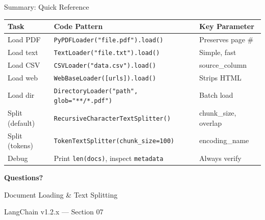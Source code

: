 \documentclass[aspectratio=169,11pt]{beamer}
\begin{document}
\begin{frame}{Summary: Quick Reference}
  \begin{center}
    \small
    \begin{tabular}{lll}
      \toprule
      \textbf{Task} & \textbf{Code Pattern} & \textbf{Key Parameter} \\
      \midrule
      Load PDF & \texttt{PyPDFLoader("file.pdf").load()} & Preserves page \# \\
      Load text & \texttt{TextLoader("file.txt").load()} & Simple, fast \\
      Load CSV & \texttt{CSVLoader("data.csv").load()} & source\_column \\
      Load web & \texttt{WebBaseLoader([urls]).load()} & Strips HTML \\
      Load dir & \texttt{DirectoryLoader("path", glob="**/*.pdf")} & Batch load \\
      Split (default) & \texttt{RecursiveCharacterTextSplitter()} & chunk\_size, overlap \\
      Split (tokens) & \texttt{TokenTextSplitter(chunk\_size=100)} & encoding\_name \\
      Debug & Print \texttt{len(docs)}, inspect \texttt{metadata} & Always verify \\
      \bottomrule
    \end{tabular}
  \end{center}
\end{frame}

\begin{frame}
  \centering
  \Huge\textbf{Questions?}

  \vspace{2cm}
  \Large Document Loading \& Text Splitting

  \vspace{1cm}
  \normalsize LangChain v1.2.x --- Section 07
\end{frame}
\end{document}
